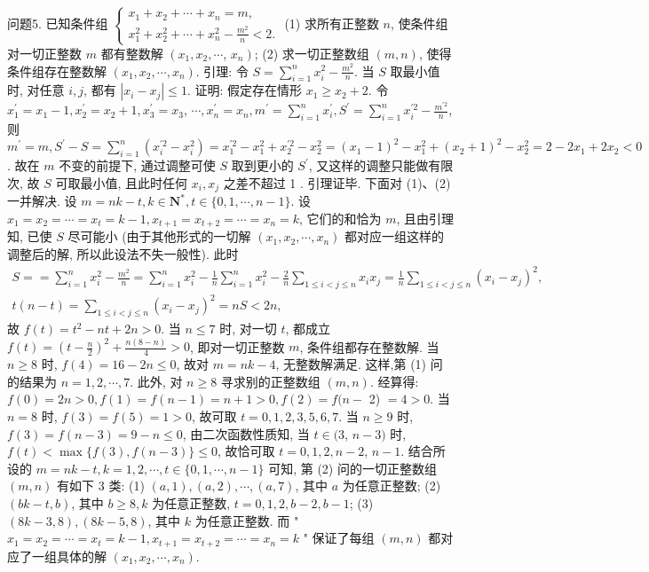 问题5. 已知条件组 $\left\{\begin{array}{l}x_1+x_2+\cdots+x_n=m, \\ x_1^2+x_2^2+\cdots+x_n^2-\frac{m^2}{n}<2 .\end{array}\right.$
(1) 求所有正整数 $n$, 使条件组对一切正整数 $m$ 都有整数解 $\left(x_1, x_2, \cdots\right.$, $\left.x_n\right)$;
(2) 求一切正整数组 $(m, n)$, 使得条件组存在整数解 $\left(x_1, x_2, \cdots, x_n\right)$.
引理: 令 $S=\sum_{i=1}^n x_i^2-\frac{m^2}{n}$. 当 $S$ 取最小值时, 对任意 $i, j$, 都有 $\left|x_i-x_j\right| \leqslant 1$.
证明: 假定存在情形 $x_1 \geqslant x_2+2$. 令 $x_1^{\prime}=x_1-1, x_2^{\prime}=x_2+1, x_3^{\prime}=x_3$,
$\cdots, x_n^{\prime}=x_n, m^{\prime}=\sum_{i=1}^n x_i^{\prime}, S^{\prime}=\sum_{i=1}^n x_i^{\prime 2}-\frac{m^{\prime 2}}{n}$, 则 $m^{\prime}=m, S^{\prime}-S=\sum_{i=1}^n\left(x_i^{\prime 2}-\right. \left.x_i^2\right)=x_1^{\prime 2}-x_1^2+x_2^{\prime 2}-x_2^2=\left(x_1-1\right)^2-x_1^2+\left(x_2+1\right)^2-x_2^2=2-2 x_1+ 2 x_2<0$. 故在 $m$ 不变的前提下, 通过调整可使 $S$ 取到更小的 $S^{\prime}$, 又这样的调整只能做有限次, 故 $S$ 可取最小值, 且此时任何 $x_i, x_j$ 之差不超过 1 . 引理证毕.
下面对 (1)、(2)一并解决.
设 $m=n k-t, k \in \mathbf{N}^*, t \in\{0,1, \cdots, n-1\}$.
设 $x_1=x_2=\cdots=x_t=k-1, x_{t+1}=x_{t+2}=\cdots=x_n=k$, 它们的和恰为 $m$, 且由引理知, 已使 $S$ 尽可能小 (由于其他形式的一切解 $\left(x_1, x_2, \cdots, x_n\right)$ 都对应一组这样的调整后的解, 所以此设法不失一般性). 此时
$$
\begin{gathered}
S==\sum_{i=1}^n x_i^2-\frac{m^2}{n}=\sum_{i=1}^n x_i^2-\frac{1}{n} \sum_{i=1}^n x_i^2-\frac{2}{n} \sum_{1 \leqslant i<j \leqslant n} x_i x_j=\frac{1}{n} \sum_{1 \leqslant i<j \leqslant n}\left(x_i-x_j\right)^2, \\
t(n-t)=\sum_{1 \leqslant i<j \leqslant n}\left(x_i-x_j\right)^2=n S<2 n,
\end{gathered}
$$
故 $f(t)=t^2-n t+2 n>0$.
当 $n \leqslant 7$ 时, 对一切 $t$, 都成立 $f(t)=\left(t-\frac{n}{2}\right)^2+\frac{n(8-n)}{4}>0$, 即对一切正整数 $m$, 条件组都存在整数解.
当 $n \geqslant 8$ 时, $f(4)=16-2 n \leqslant 0$, 故对 $m=n k-4$, 无整数解满足.
这样,第 (1) 问的结果为 $n=1,2, \cdots, 7$.
此外, 对 $n \geqslant 8$ 寻求别的正整数组 $(m, n)$.
经算得: $f(0)=2 n>0, f(1)=f(n-1)=n+1>0, f(2)=f(n-$ 2) $=4>0$.
当 $n=8$ 时, $f(3)=f(5)=1>0$, 故可取 $t=0,1,2,3,5,6,7$.
当 $n \geqslant 9$ 时, $f(3)=f(n-3)=9-n \leqslant 0$, 由二次函数性质知, 当 $t \in(3$, $n-3)$ 时, $f(t)<\max \{f(3), f(n-3)\} \leqslant 0$, 故恰可取 $t=0,1,2, n-2$, $n-1$. 结合所设的 $m=n k-t, k=1,2, \cdots, t \in\{0,1, \cdots, n-1\}$ 可知, 第 (2) 问的一切正整数组 $(m, n)$ 有如下 3 类:
(1) $(a, 1),(a, 2), \cdots,(a, 7)$, 其中 $a$ 为任意正整数;
(2) $(b k-t, b)$, 其中 $b \geqslant 8, k$ 为任意正整数, $t=0,1,2, b-2, b-1$;
(3) $(8 k-3,8),(8 k-5,8)$, 其中 $k$ 为任意正整数.
而 " $x_1=x_2=\cdots=x_t=k-1, x_{t+1}=x_{t+2}=\cdots=x_n=k$ " 保证了每组 $(m, n)$ 都对应了一组具体的解 $\left(x_1, x_2, \cdots, x_n\right)$.



